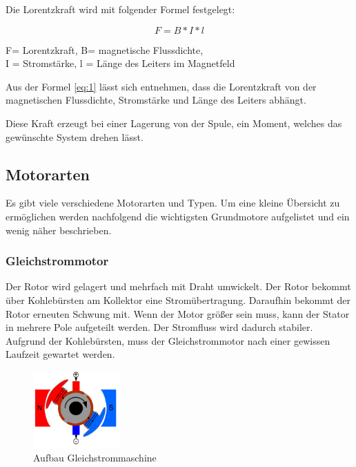 Die Lorentzkraft wird mit folgender Formel festgelegt:

\begin{equation}
\label{eq:1}
 F = B * I * l
\end{equation}
\begin{center}
F= Lorentzkraft, B= magnetische Flussdichte, \\ I = Stromstärke, l = Länge des Leiters im Magnetfeld
\end{center}

Aus der Formel \ref{eq:1} lässt sich entnehmen, dass die Lorentzkraft von der magnetischen Flussdichte, Stromstärke und Länge des Leiters abhängt.

Diese Kraft erzeugt bei einer Lagerung von der Spule, ein Moment, welches das gewünschte System drehen lässt.

\subsection{Motorarten}
\label{sec:motorarten}

Es gibt viele verschiedene Motorarten und Typen. Um eine kleine Übersicht zu ermöglichen werden nachfolgend die wichtigsten Grundmotore aufgelistet und ein wenig näher beschrieben.

\subsubsection{Gleichstrommotor}
\label{sec:gleichstrommotor}

Der Rotor wird gelagert und mehrfach mit Draht umwickelt. Der Rotor bekommt über Kohlebürsten am Kollektor eine Stromübertragung. Daraufhin bekommt der Rotor erneuten Schwung mit. Wenn der Motor größer sein muss, kann der Stator in mehrere Pole aufgeteilt werden. Der Stromfluss wird dadurch stabiler. Aufgrund der Kohlebürsten, muss der Gleichstrommotor nach einer gewissen Laufzeit gewartet werden.

\begin{figure}[H]
\begin{center}
	\includegraphics[width=0.3\textwidth]{fig/Gleichstommaschine}
	\caption{Aufbau Gleichstrommaschine \label{fig:gleichstrommotor}}
\end{center}
\end{figure}

